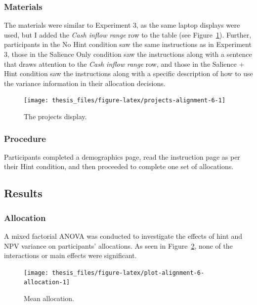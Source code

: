 \documentclass[a4paper, nobind, dvipsnames]{templates/ociamthesis}
\theoremstyle{definition}
\theoremstyle{definition}
\theoremstyle{definition}
\theoremstyle{definition}
\theoremstyle{remark}
\begin{document}
\hypertarget{materials-15}{%
\subsubsection{Materials}\label{materials-15}}

The materials were similar to Experiment 3, as the same laptop displays were
used, but I added the \emph{Cash inflow range} row to the table (see
Figure~\ref{fig:projects-alignment-6}). Further, participants in the No Hint
condition saw the same instructions as in Experiment 3, those in the Salience
Only condition saw the instructions along with a sentence that draws attention
to the \emph{Cash inflow range} row, and those in the Salience + Hint condition saw
the instructions along with a specific description of how to use the variance
information in their allocation decisions.



\begin{figure}
\texttt{[image: thesis\_files/figure-latex/projects-alignment-6-1]} \caption{The projects display.}\label{fig:projects-alignment-6}
\end{figure}

\hypertarget{procedure-11}{%
\subsubsection{Procedure}\label{procedure-11}}

Participants completed a demographics page, read the instruction page as per
their Hint condition, and then proceeded to complete one set of allocations.

\hypertarget{results-9}{%
\subsection{Results}\label{results-9}}

\hypertarget{allocation-1}{%
\subsubsection{Allocation}\label{allocation-1}}

A mixed factorial ANOVA was conducted to investigate the effects of hint
and NPV variance on participants' allocations. As seen in
Figure~\ref{fig:plot-alignment-6-allocation}, none of the interactions or main
effects were significant.



\begin{figure}
\texttt{[image: thesis\_files/figure-latex/plot-alignment-6-allocation-1]} \caption{Mean allocation.}\label{fig:plot-alignment-6-allocation}
\end{figure}
\end{document}
